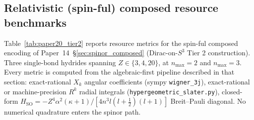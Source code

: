 
\subsection{Relativistic (spin-ful) composed resource benchmarks}
\label{subsec:paper20_tier2}

Table~\ref{tab:paper20_tier2} reports resource metrics for the
spin-ful composed encoding of Paper~14~\S\ref{sec:spinor_composed}
(Dirac-on-$S^3$ Tier 2 construction). Three single-bond hydrides
spanning $Z \in \{3, 4, 20\}$, at $n_{\max} = 2$ and $n_{\max} = 3$.
Every metric is computed from the algebraic-first pipeline described
in that section: exact-rational $X_k$ angular coefficients (sympy
\texttt{wigner\_3j}), exact-rational or machine-precision $R^k$ radial
integrals (\texttt{hypergeometric\_slater.py}), closed-form
$H_{\mathrm{SO}} = -Z^4\alpha^2(\kappa+1)/[4 n^3 l(l+\tfrac{1}{2})(l+1)]$
Breit--Pauli diagonal. No numerical quadrature enters the spinor path.

